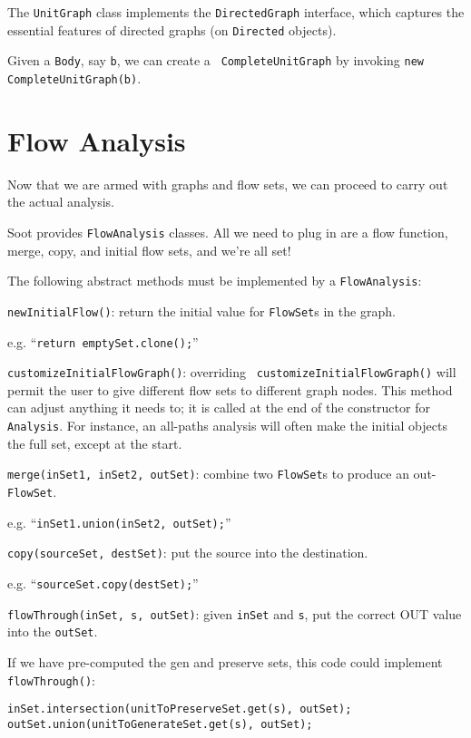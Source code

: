 \documentclass{article}
\begin{document}
The {\tt UnitGraph} class implements the {\tt DirectedGraph} interface,
which captures the essential features of directed graphs (on {\tt Directed}
objects).

Given a {\tt Body}, say {\tt b}, we can create a {\tt
CompleteUnitGraph} by invoking {\tt new CompleteUnitGraph(b)}.

\section{Flow Analysis}

Now that we are armed with graphs and flow sets, we can proceed to
carry out the actual analysis.

Soot provides {\tt FlowAnalysis} classes.  All we need to plug in are
a flow function, merge, copy, and initial flow sets, and we're all set!

The following abstract methods must be implemented by a {\tt FlowAnalysis}:

\begin{description}
\item{{\tt newInitialFlow()}:} return the initial value for {\tt FlowSet}s in
the graph.

e.g. ``{\tt return emptySet.clone();}''

\item{{\tt customizeInitialFlowGraph()}:} overriding {\tt
customizeInitialFlowGraph()} will permit the user to give different
flow sets to different graph nodes.  This method can adjust anything it
needs to; it is called at the end of the constructor for {\tt
Analysis}.  For instance, an all-paths analysis will often make the
initial objects the full set, except at the start.

\item{{\tt merge(inSet1, inSet2, outSet)}:} combine two {\tt FlowSet}s to produce
an out-{\tt FlowSet}.

e.g. ``{\tt inSet1.union(inSet2, outSet);}''

\item{{\tt copy(sourceSet, destSet)}:} put the source into the destination.

e.g. ``{\tt sourceSet.copy(destSet);}''

\item{{\tt flowThrough(inSet, s, outSet)}:} given {\tt inSet} and {\tt s}, put
the correct OUT value into the {\tt outSet}.

If we have pre-computed the gen and preserve sets, this code could implement
{\tt flowThrough()}:
\begin{verbatim}
inSet.intersection(unitToPreserveSet.get(s), outSet);
outSet.union(unitToGenerateSet.get(s), outSet);
\end{verbatim}
\end{description}
\end{document}

